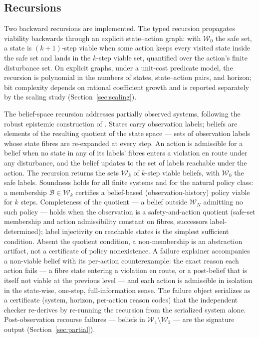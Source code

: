 \documentclass[11pt]{article}
\begin{document}
\subsection{Recursions}\label{sec:recursions}

Two backward recursions are implemented. The typed recursion propagates
viability backwards through an explicit state--action graph: with
$\mathcal{W}_0$ the safe set, a state is $(k{+}1)$-step viable when some
action keeps every visited state inside the safe set and lands in the
$k$-step viable set, quantified over the action's finite disturbance set.
On explicit graphs, under a unit-cost predicate model, the recursion is
polynomial in the numbers of states, state--action pairs, and horizon;
bit complexity depends on rational coefficient growth and is reported
separately by the scaling study (Section~\ref{sec:scaling}).

The belief-space recursion addresses partially observed systems,
following the robust epistemic construction of \citet{Abaee2026b}. States
carry observation labels; beliefs are elements of the resulting quotient
of the state space --- sets of observation labels whose state fibres are
re-expanded at every step. An action is admissible for a belief when no
state in any of its labels' fibres enters a violation en route under any
disturbance, and the belief updates to the set of labels reachable under
the action. The recursion returns the sets $\mathcal{W}_k$ of $k$-step
viable beliefs, with $\mathcal{W}_0$ the safe labels. Soundness holds for
all finite systems and for the natural policy class: a membership
$\mathcal{B} \in \mathcal{W}_k$ certifies a belief-based
(observation-history) policy viable for $k$ steps. Completeness of the
quotient --- a belief outside $\mathcal{W}_N$ admitting no such policy ---
holds when the observation is a safety-and-action quotient (safe-set
membership and action admissibility constant on fibres, successors
label-determined); label injectivity on reachable states is the simplest
sufficient condition. Absent the quotient condition, a non-membership is
an abstraction artifact, not a certificate of policy nonexistence. A
failure explainer accompanies a non-viable belief with its per-action
counterexample: the exact reason each action fails --- a fibre state
entering a violation en route, or a post-belief that is itself not viable
at the previous level --- and each action is admissible in isolation in
the state-wise, one-step, full-information sense. The failure object
serializes as a certificate (system, horizon, per-action reason codes)
that the independent checker re-derives by re-running the recursion from
the serialized system alone. Post-observation recourse failures ---
beliefs in $\mathcal{W}_1 \setminus \mathcal{W}_2$ --- are the signature
output (Section~\ref{sec:partial}).
\end{document}
